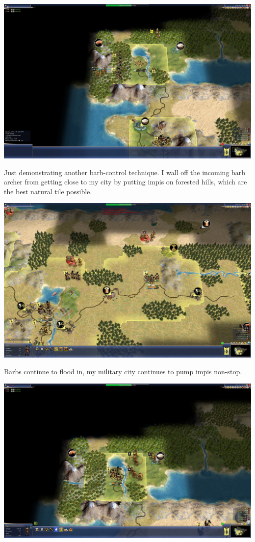 \documentclass[10pt]{article}
\begin{document}
\includegraphics[width=1.0\textwidth]{59}

Just demonstrating another barb-control technique. I wall off the incoming barb archer from getting close
to my city by putting impis on forested hills, which are the best natural tile possible.

\includegraphics[width=1.0\textwidth]{60}

Barbs continue to flood in, my military city continues to pump impis non-stop.

\includegraphics[width=1.0\textwidth]{62}
\end{document}
